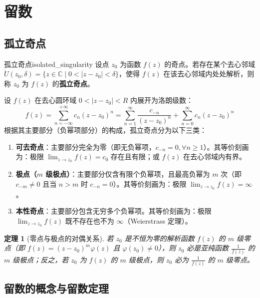 \documentclass[11pt,a4paper,fontset=fandol]{ctexart}
\newtheorem{theorem}{定理}[section]
\theoremstyle{remark}
\begin{document}
\section{留数}

\subsection{孤立奇点}

\begin{definition}{孤立奇点}{isolated_singularity}
设点 $z_0$ 为函数 $f(z)$ 的奇点。若存在某个去心邻域 $\mathring{U}(z_0, \delta) = \{z \in \mathbb{C} \mid 0 < |z - z_0| < \delta\}$，使得 $f(z)$ 在该去心邻域内处处解析，则称 $z_0$ 为 $f(z)$ 的\textbf{孤立奇点}。
\end{definition}

设 $f(z)$ 在去心圆环域 $0 < |z - z_0| < R$ 内展开为洛朗级数：
\begin{equation}
    f(z) = \sum_{n=-\infty}^{+\infty} c_n (z - z_0)^n = \sum_{n=1}^\infty \frac{c_{-n}}{(z - z_0)^n} + \sum_{n=0}^\infty c_n (z - z_0)^n
\end{equation}
根据其主要部分（负幂项部分）的构成，孤立奇点分为以下三类：
\begin{enumerate}
    \item \textbf{可去奇点}：主要部分完全为零（即无负幂项，$c_{-n} = 0, \forall n \ge 1$）。其等价刻画为：极限 $\lim_{z \to z_0} f(z) = c_0$ 存在且有限；或 $f(z)$ 在去心邻域内有界。
    \item \textbf{极点（$m$ 级极点）}：主要部分仅含有限个负幂项，且最高负幂为 $m$ 次（即 $c_{-m} \neq 0$ 且当 $n > m$ 时 $c_{-n} = 0$）。其等价刻画为：极限 $\lim_{z \to z_0} f(z) = \infty$。
    \item \textbf{本性奇点}：主要部分包含无穷多个负幂项。其等价刻画为：极限 $\lim_{z \to z_0} f(z)$ 既不存在也不为 $\infty$（Weierstrass 定理）。
\end{enumerate}

\begin{theorem}[零点与极点的对偶关系]
若 $z_0$ 是不恒为零的解析函数 $f(z)$ 的 $m$ 级零点（即 $f(z) = (z - z_0)^m \varphi(z)$ 且 $\varphi(z_0) \neq 0$），则 $z_0$ 必是亚纯函数 $\frac{1}{f(z)}$ 的 $m$ 级极点；反之，若 $z_0$ 为 $f(z)$ 的 $m$ 级极点，则 $z_0$ 必为 $\frac{1}{f(z)}$ 的 $m$ 级零点。
\end{theorem}

\subsection{留数的概念与留数定理}
\end{document}
